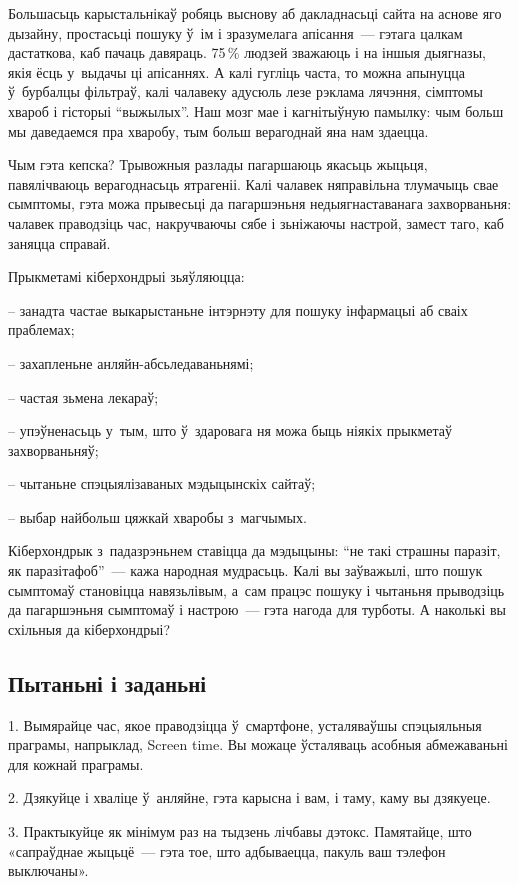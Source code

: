 Большасьць карыстальнікаў робяць выснову аб дакладнасьці сайта на аснове яго дызайну, простасьці пошуку ў~ім і зразумелага апісання~--- гэтага цалкам дастаткова, каб пачаць давяраць. 75\,\% людзей зважаюць і на іншыя дыягназы, якія ёсць у~выдачы ці апісаннях. А калі гугліць часта, то можна апынуцца ў~бурбалцы фільтраў, калі чалавеку адусюль лезе рэклама лячэння, сімптомы хвароб і гісторыі ``выжылых''. Наш мозг мае і кагнітыўную памылку: чым больш мы даведаемся пра хваробу, тым больш верагоднай яна нам здаецца.

Чым гэта кепска? Трывожныя разлады пагаршаюць якасьць жыцьця, павялічваюць верагоднасьць ятрагеніі. Калі чалавек няправільна тлумачыць свае сымптомы, гэта можа прывесьці да пагаршэньня недыягнаставанага захворваньня: чалавек праводзіць час, накручваючы сябе і зьніжаючы настрой, замест таго, каб заняцца справай. 

Прыкметамі кіберхондрыі зьяўляюцца: 

– занадта частае выкарыстаньне інтэрнэту для пошуку інфармацыі аб сваіх праблемах;

– захапленьне анляйн-абсьледаваньнямі;

– частая зьмена лекараў;

– упэўненасьць у~тым, што ў~здаровага ня можа быць ніякіх прыкметаў захворваньняў;

– чытаньне спэцыялізаваных мэдыцынскіх сайтаў;

– выбар найбольш цяжкай хваробы з~магчымых.

Кіберхондрык з~падазрэньнем ставіцца да мэдыцыны: ``не такі страшны паразіт, як паразітафоб''~--- кажа народная мудрасьць. Калі вы заўважылі, што пошук сымптомаў становіцца навязьлівым, а~сам працэс пошуку і чытаньня прыводзіць да пагаршэньня сымптомаў і настрою~--- гэта нагода для турботы. А наколькі вы схільныя да кіберхондрыі?

\subsection*{Пытаньні і заданьні}

1. Вымярайце час, якое праводзіцца ў~смартфоне, усталяваўшы спэцыяльныя праграмы, напрыклад, Screen time. Вы можаце ўсталяваць асобныя абмежаваньні для кожнай праграмы.

2. Дзякуйце і хваліце ў~анляйне, гэта карысна і вам, і таму, каму вы дзякуеце.

3. Практыкуйце як мінімум раз на тыдзень лічбавы дэтокс. Памятайце, што «сапраўднае жыцьцё~--- гэта тое, што адбываецца, пакуль ваш тэлефон выключаны».

